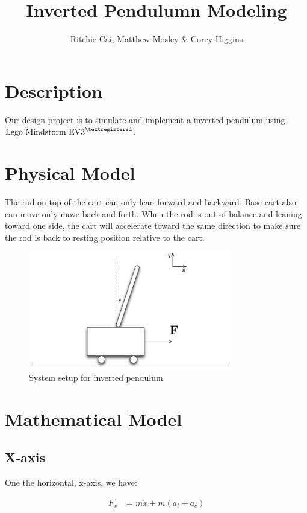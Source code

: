 \documentclass{notes}
\author{Ritchie Cai, Matthew Mosley \& Corey Higgins}
\title{Inverted Pendulumn Modeling}
\begin{document}
\maketitle 

\section{Description}
Our design project is to simulate and implement a inverted pendulum using 
$\text{Lego Mindstorm EV3}^{\textregistered}$. 

\section{Physical Model}

The rod on top of the cart can only lean forward and backward. 
Base cart also can move only move back and forth. 
When the rod is out of balance and leaning toward one side, the cart will accelerate toward the same
direction to make sure the rod is back to resting position relative to the cart.

\begin{figure}[!h]
  \begin{center}
    \includegraphics[width=3.5in]{pics/full_system.eps}
  \end{center}
  \caption{System setup for inverted pendulum}
  \label{fig:full_system}
\end{figure}


\section{Mathematical Model}



\subsection{X-axis}
One the horizontal, x-axis, we have:

\begin{align*}
    F_x & = m \ddot{x} + m (a_{t} + a_{c})
\end{align*}
\end{document}
